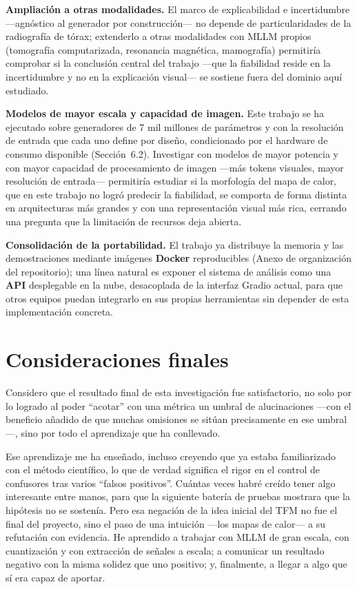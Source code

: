 \textbf{Ampliación a otras modalidades.} El marco de explicabilidad e incertidumbre —agnóstico al
generador por construcción— no depende de particularidades de la radiografía de tórax; extenderlo a
otras modalidades con MLLM propios (tomografía computarizada, resonancia magnética, mamografía)
permitiría comprobar si la conclusión central del trabajo —que la fiabilidad reside en la incertidumbre
y no en la explicación visual— se sostiene fuera del dominio aquí estudiado.

\textbf{Modelos de mayor escala y capacidad de imagen.} Este trabajo se ha ejecutado sobre generadores
de 7 mil millones de parámetros y con la resolución de entrada que cada uno define por diseño,
condicionado por el hardware de consumo disponible (Sección~6.2). Investigar con modelos de mayor
potencia y con mayor capacidad de procesamiento de imagen —más tokens visuales, mayor resolución de
entrada— permitiría estudiar si la morfología del mapa de calor, que en este trabajo no logró predecir
la fiabilidad, se comporta de forma distinta en arquitecturas más grandes y con una representación
visual más rica, cerrando una pregunta que la limitación de recursos deja abierta.

\textbf{Consolidación de la portabilidad.} El trabajo ya distribuye la memoria y las demostraciones
mediante imágenes \textbf{Docker} reproducibles (Anexo de organización del repositorio); una línea
natural es exponer el sistema de análisis como una \textbf{API} desplegable en la nube, desacoplada de
la interfaz Gradio actual, para que otros equipos puedan integrarlo en sus propias herramientas sin
depender de esta implementación concreta.

\section{Consideraciones finales}
Considero que el resultado final de esta investigación fue satisfactorio, no solo por lo logrado al
poder ``acotar'' con una métrica un umbral de alucinaciones —con el beneficio añadido de que muchas
omisiones se sitúan precisamente en ese umbral—, sino por todo el aprendizaje que ha conllevado.

Ese aprendizaje me ha enseñado, incluso creyendo que ya estaba familiarizado con el método científico,
lo que de verdad significa el rigor en el control de confusores tras varios ``falsos positivos''.
Cuántas veces habré creído tener algo interesante entre manos, para que la siguiente batería de
pruebas mostrara que la hipótesis no se sostenía. Pero esa negación de la idea inicial del TFM no fue
el final del proyecto, sino el paso de una intuición —los mapas de calor— a su refutación con
evidencia. He aprendido a trabajar con MLLM de gran escala, con cuantización y con extracción de
señales a escala; a comunicar un resultado negativo con la misma solidez que uno positivo; y,
finalmente, a llegar a algo que sí era capaz de aportar.

